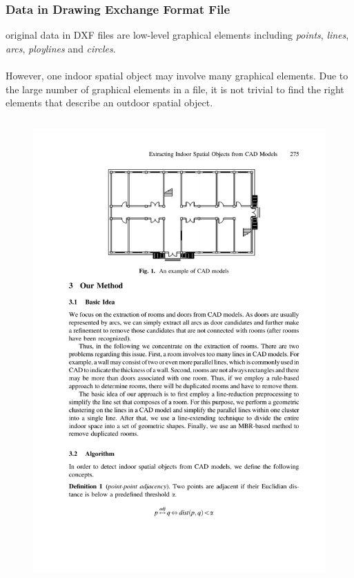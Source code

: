 \begin{frame}
\frametitle{Data in Drawing Exchange Format File}

original data in DXF files are low-level graphical elements including \emph{points}, \emph{lines}, \emph{arcs}, \emph{ploylines} and \emph{circles}.\\~\\

However, one indoor spatial object may involve many graphical elements. Due to the large number of graphical elements in a file, it is not trivial to find the right elements that describe an outdoor spatial object.

\begin{columns}

  \begin{figure}[tb]
    \includegraphics[width=0.9\columnwidth]{figures/2-8/2-8-1.pdf}
  \end{figure}


\end{columns}

\end{frame}

